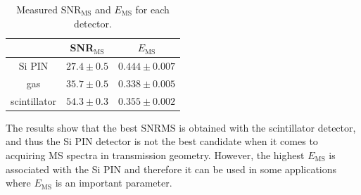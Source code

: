
\begin{table}[H]
\centering
\begin{tabular}{|c|c|c|}
\hline
   & SNR$_{\textrm{MS}}$ & $E_{\textrm{MS}}$ \\ \hline
Si PIN & $27.4 \pm 0.5$    & $0.444 \pm 0.007$  \\ \hline
gas & $35.7 \pm 0.5$    & $0.338 \pm 0.005$ \\ \hline
scintillator  & $54.3 \pm 0.3$    & $0.355 \pm 0.002$ \\ \hline
\end{tabular}
\caption{Measured SNR$_{\textrm{MS}}$ and $E_{\textrm{MS}}$ for each detector.}
 \label{mossres}
\end{table}

The results show that the best SNR${\textrm{MS}}$ is obtained with the scintillator detector, and thus the Si PIN detector is not the best candidate when it comes to acquiring MS spectra in transmission geometry. However, the highest $E_{\textrm{MS}}$ is associated with the Si PIN and therefore it can be used in some applications where $E_{\textrm{MS}}$ is an important parameter. 

